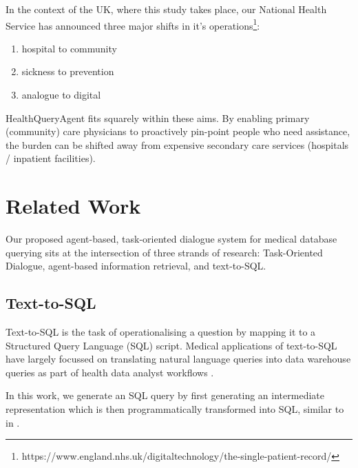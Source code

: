 \documentclass[11pt]{article}
\begin{document}
In the context of the UK, where this study takes place, our National Health Service has announced three major shifts in it's operations\footnote{https://www.england.nhs.uk/digitaltechnology/the-single-patient-record/}:

\begin{enumerate}
	\item hospital to community
	\item sickness to prevention
	\item analogue to digital
\end{enumerate}

HealthQueryAgent fits squarely within these aims. By enabling primary (community) care physicians to proactively pin-point people who need assistance, the burden can be shifted away from expensive secondary care services (hospitals / inpatient facilities).

\section{Related Work}

Our proposed agent-based, task-oriented dialogue system for medical database querying sits at the intersection of three strands of research: Task-Oriented Dialogue, agent-based information retrieval, and text-to-SQL.

\subsection{Text-to-SQL}
Text-to-SQL is the task of operationalising a question by mapping it to a Structured Query Language (SQL) script. Medical applications of text-to-SQL have largely focussed on translating natural language queries into data warehouse queries as part of health data analyst workflows \citet{ziletti_retrieval_2024, ziletti_generating_2025}.

In this work, we generate an SQL query by first generating an intermediate representation which is then programmatically transformed into SQL, similar to in \cite{guo_towards_2019}.
\end{document}
